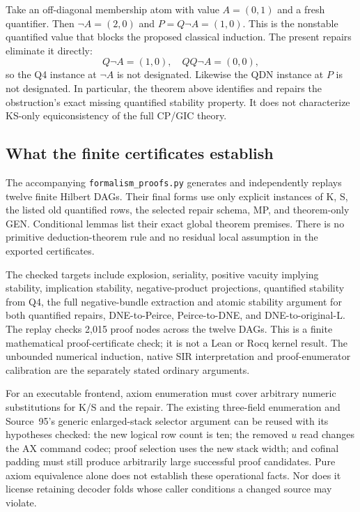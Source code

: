 Take an off-diagonal membership atom with value $A=(0,1)$ and a fresh
quantifier. Then $\neg A=(2,0)$ and $P=Q\neg A=(1,0)$.
This is the nonstable quantified value that blocks the proposed
classical induction. The present repairs eliminate it directly:
\[
 Q\neg A=(1,0),\quad QQ\neg A=(0,0),
\]
so the Q4 instance at $\neg A$ is not designated. Likewise the QDN
instance at $P$ is not designated. In particular, the theorem above
identifies and repairs the obstruction's exact missing quantified
stability property. It does not characterize KS-only equiconsistency
of the full CP/GIC theory.

\subsection{What the finite certificates establish}

The accompanying \texttt{formalism\_proofs.py} generates and independently
replays twelve finite Hilbert DAGs. Their final forms use only explicit
instances of K, S, the listed old quantified rows, the selected repair
schema, MP, and theorem-only GEN. Conditional lemmas list their exact
global theorem premises. There is no primitive deduction-theorem rule
and no residual local assumption in the exported certificates.

The checked targets include explosion, seriality, positive vacuity
implying stability, implication stability, negative-product projections,
quantified stability from Q4, the full negative-bundle extraction and
atomic stability argument for both quantified repairs, DNE-to-Peirce,
Peirce-to-DNE, and DNE-to-original-L. The replay checks 2,015 proof nodes
across the twelve DAGs. This is a finite mathematical proof-certificate
check; it is not a Lean or Rocq kernel result. The unbounded numerical
induction, native SIR interpretation and proof-enumerator calibration
are the separately stated ordinary arguments.

For an executable frontend, axiom enumeration must cover arbitrary
numeric substitutions for K/S and the repair. The existing three-field
enumeration and Source~95's generic enlarged-stack selector argument
can be reused with its hypotheses checked: the new logical row count is
ten; the removed $u$ read changes the AX command codec; proof selection
uses the new stack width; and cofinal padding must still produce
arbitrarily large successful proof candidates. Pure axiom equivalence
alone does not establish these operational facts. Nor does it license
retaining decoder folds whose caller conditions a changed source may
violate.

